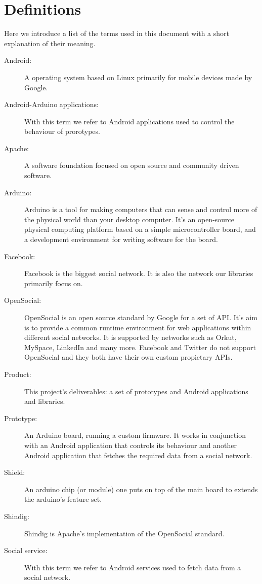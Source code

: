 \section{Definitions}

Here we introduce a list of the terms used in this document with a short explanation of their meaning.

\begin{description}
\item[Android:] A operating system based on Linux primarily for mobile devices made by Google.
\item[Android-Arduino applications:] With this term we refer to Android applications used to control the behaviour of prorotypes.
\item[Apache:] A software foundation focused on open source and community driven software.
\item[Arduino:] Arduino is a tool for making computers that can sense and control more of the physical world than your
desktop computer. It's an open-source physical computing platform based on a simple microcontroller board, and a development
environment for writing software for the board. \cite{link:arduino}
\item[Facebook:] Facebook is the biggest social network. It is also the network our libraries primarily focus on.
\item[OpenSocial:] OpenSocial\cite{link:opensocial} is an open source standard by Google for a set of API. It's aim is to
provide a common runtime environment for web applications within different social networks. It is supported by networks
such as Orkut, MySpace, LinkedIn and many more. Facebook and Twitter do not support OpenSocial and they both have their
own custom propietary APIs.
\item[Product:] This project's deliverables: a set of prototypes and Android applications and libraries.
\item[Prototype:] An Arduino board, running a custom firmware. It works in conjunction with an Android application
that controls its behaviour and another Android application that fetches the required data from a social network.
\item[Shield:] An arduino chip (or module) one puts on top of the main board to extends the arduino's feature set.
\item[Shindig:] Shindig is Apache's implementation of the OpenSocial standard.
\item[Social service:] With this term we refer to Android services used to fetch data from a social network.
\end{description}
